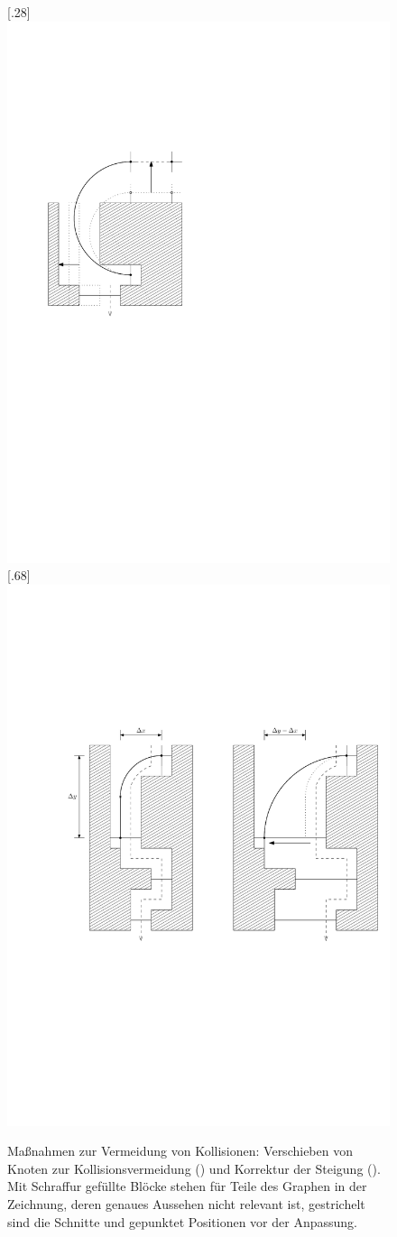 \documentclass[a4paper]{scrreprt}
\theoremstyle{definition}
\begin{document}
\begin{figure}[h]
        \centering
       [.28\textwidth]
            {\includegraphics[width=.28\textwidth]{accomodate_C_edge}}
        \quad
       [.68\textwidth]
            {\includegraphics[width=.68\textwidth]{cut_L_slope_correction}}
 
        \caption{Maßnahmen zur Vermeidung von Kollisionen: Verschieben von Knoten zur Kollisionsvermeidung () und Korrektur der Steigung (). Mit Schraffur gefüllte Blöcke stehen für Teile des Graphen in der Zeichnung, deren genaues Aussehen nicht relevant ist, gestrichelt sind die Schnitte und gepunktet Positionen vor der Anpassung.}
        \label{fig:collisionAvoidanceAndSlopeCorrection}
\end{figure}
\end{document}
